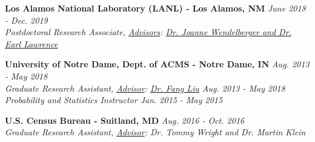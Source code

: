 \workspace
    \textbf{Los Alamos National Laboratory (LANL) - Los Alamos, NM} \hfill \textit{June 2018 - Dec. 2019}\\
    \textit{Postdoctoral Research Associate, \underline{Advisors}: \href{http://www.lanl.gov/expertise/profiles/view/joanne-wendelberger}{Dr. Joanne Wendelberger and Dr. Earl Lawrence}}

\workspace
    \textbf{University of Notre Dame, Dept. of ACMS - Notre Dame, IN} \hfill \textit{Aug. 2013 - May 2018}\\
    \textit{Graduate Research Assistant, \underline{Advisor}: \href{http://acms.nd.edu/people/faculty/fang-liu/}{Dr. Fang Liu} \hfill Aug. 2013 - May 2018}\\
    \textit{Probability and Statistics Instructor \hfill Jan. 2015 - May 2015}

\workspace
    \textbf{U.S. Census Bureau - Suitland, MD} \hfill \textit{Aug. 2016 - Oct. 2016}\\
    \textit{Graduate Research Assistant, \underline{Advisor}: Dr. Tommy Wright and Dr. Martin Klein}
    
